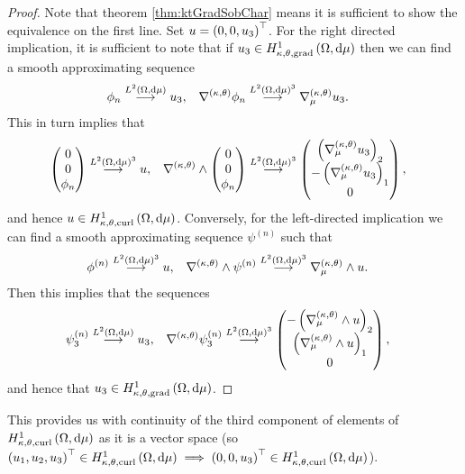 \begin{proof}
	Note that theorem \ref{thm:ktGradSobChar} means it is sufficient to show the equivalence on the first line.
	Set $u = \bracs{0,0,u_3}^{\top}$.
	For the right directed implication, it is sufficient to note that if $u_3\in\ktgradSob{\ddom}{\ddmes}$ then we can find a smooth approximating sequence
	\begin{align*}
		\phi_n \lconv{\ltwo{\ddom}{\ddmes}} u_3, &\quad \ktgrad\phi_n \lconv{\ltwo{\ddom}{\ddmes}^3} \ktgrad_{\ddmes}u_3.
	\end{align*}
	This in turn implies that
	\begin{align*}
		\begin{pmatrix} 0 \\ 0 \\ \phi_n \end{pmatrix} \lconv{\ltwo{\ddom}{\ddmes}^3} u,
		&\quad \ktcurl{} \begin{pmatrix} 0 \\ 0 \\ \phi_n \end{pmatrix} \lconv{\ltwo{\ddom}{\ddmes}^3} \begin{pmatrix} \bracs{\ktgrad_{\ddmes}u_3}_2 \\ -\bracs{\ktgrad_{\ddmes}u_3}_1 \\ 0 \end{pmatrix},
	\end{align*}
	and hence $u\in\ktcurlSob{\ddom}{\ddmes}$.
	Conversely, for the left-directed implication we can find a smooth approximating sequence $\psi^{(n)}$ such that
	\begin{align*}
		\phi^{(n)} \lconv{\ltwo{\ddom}{\ddmes}^3} u, 
		&\quad \ktcurl{}\psi^{(n)} \lconv{\ltwo{\ddom}{\ddmes}^3} \ktcurl{\ddmes}u.
	\end{align*}
	Then this implies that the sequences
	\begin{align*}
		\psi^{(n)}_3 \lconv{\ltwo{\ddom}{\ddmes}} u_3,
		&\quad \ktgrad\psi^{(n)}_3 \lconv{\ltwo{\ddom}{\ddmes}^3} \begin{pmatrix} -\bracs{\ktcurl{\ddmes}u}_2 \\ \bracs{\ktcurl{\ddmes}u}_1 \\ 0 \end{pmatrix},
	\end{align*}
	and hence that $u_3\in\ktgradSob{\ddom}{\ddmes}$.
\end{proof}
This provides us with continuity of the third component of elements of $\ktcurlSob{\ddom}{\ddmes}$ as it is a vector space (so $\bracs{u_1,u_2,u_3}^{\top}\in\ktcurlSob{\ddom}{\ddmes} \implies \bracs{0,0,u_3}^{\top}\in\ktcurlSob{\ddom}{\ddmes}$).
